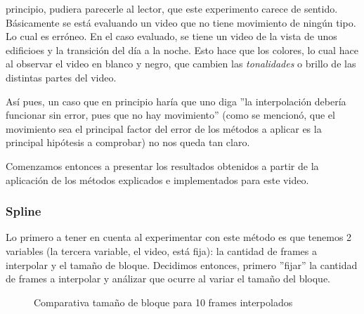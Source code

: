  principio, pudiera parecerle al lector, que este experimento
carece de sentido. B\'asicamente se est\'a evaluando un video que no tiene
movimiento de ning\'un tipo. Lo cual es err\'oneo. En el caso evaluado, se tiene
un video de la vista de unos edificioes y la transici\'on del d\'ia a la noche.
Esto hace que los colores, lo cual hace al observar el video en blanco y negro,
que cambien las \emph{tonalidades} o brillo de las distintas partes del video.

\par As\'i pues, un caso que en principio har\'ia que uno diga ''la
interpolaci\'on deber\'ia funcionar sin error, pues que no hay movimiento''
(como se mencion\'o, que el movimiento sea el principal factor del error de los
m\'etodos a aplicar es la principal hip\'otesis a comprobar) no nos queda tan
claro.

\par Comenzamos entonces a presentar los resultados obtenidos a partir de la
aplicaci\'on de los m\'etodos explicados e implementados para este video.

\subsubsection{Spline}
\par Lo primero a tener en cuenta al experimentar con este m\'etodo es que
tenemos 2 variables (la tercera variable, el video, est\'a fija): la cantidad
de frames a interpolar y el tama\~no de bloque. Decidimos entonces, primero
''fijar'' la cantidad de frames a interpolar y an\'alizar que ocurre al variar
el tama\~no del bloque.

\begin{figure}[H]
    \centering
    \caption{Comparativa tama\~no de bloque para 10 frames interpolados}
    \label{fig:fija-fija_spline-bloques}
\end{figure}

